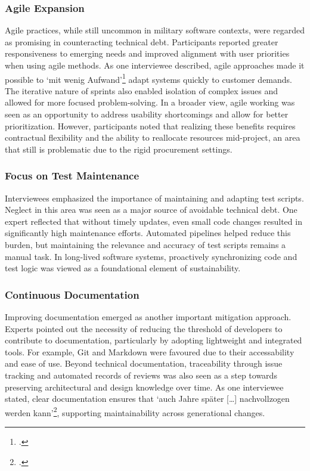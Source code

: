\subsubsection{Agile Expansion}
Agile practices, while still uncommon in military software contexts, were regarded as promising in counteracting technical debt. Participants reported greater responsiveness to emerging needs and improved alignment with user priorities when using agile methods.
As one interviewee described, agile approaches made it possible to `mit wenig Aufwand'\footcite{Interview32025} adapt systems quickly to customer demands. The iterative nature of sprints also enabled isolation of complex issues and allowed for more focused problem-solving.
In a broader view, agile working was seen as an opportunity to address usability shortcomings and allow for better prioritization. However, participants noted that realizing these benefits requires contractual flexibility and the ability to reallocate resources mid-project, an area that still is problematic due to the rigid procurement settings.\\

\subsubsection{Focus on Test Maintenance}
Interviewees emphasized the importance of maintaining and adapting test scripts. Neglect in this area was seen as a major source of avoidable technical debt. One expert reflected that without timely updates, even small code changes resulted in significantly high maintenance efforts.
Automated pipelines helped reduce this burden, but maintaining the relevance and accuracy of test scripts remains a manual task. In long-lived software systems, proactively synchronizing code and test logic was viewed as a foundational element of sustainability.\\

\subsubsection{Continuous Documentation}
Improving documentation emerged as another important mitigation approach. Experts pointed out the necessity of reducing the threshold of developers to contribute to documentation, particularly by adopting lightweight and integrated tools. For example, Git and Markdown were favoured due to their accessability and ease of use.
Beyond technical documentation, traceability through issue tracking and automated records of reviews was also seen as a step towards preserving architectural and design knowledge over time. As one interviewee stated, clear documentation ensures that `auch Jahre später [\ldots] nachvollzogen werden kann'\footcite{Interview22025}, supporting maintainability across generational changes.\\

